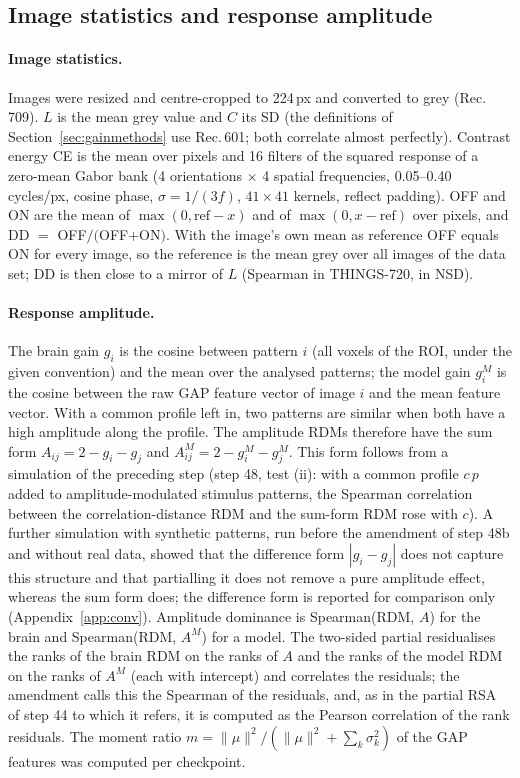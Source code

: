 \subsection{Image statistics and response amplitude}
\label{sec:ampmethods}

\paragraph{Image statistics.} Images were resized and centre-cropped to 224\,px and converted to grey
(Rec.\,709). $L$ is the mean grey value and $C$ its SD (the definitions of Section~\ref{sec:gainmethods}
use Rec.\,601; both correlate almost perfectly). Contrast energy CE is the mean over pixels and 16
filters of the squared response of a zero-mean Gabor bank (4 orientations $\times$ 4 spatial
frequencies, 0.05--0.40 cycles/px, cosine phase, $\sigma = 1/(3 f)$, $41 \times 41$ kernels, reflect
padding). OFF and ON are the mean of $\max(0, \mathrm{ref} - x)$ and of $\max(0, x - \mathrm{ref})$
over pixels, and DD $=$ OFF$/($OFF$+$ON$)$. With the image's own mean as reference OFF equals ON for
every image, so the reference is the mean grey over all images of the data set; DD is then close to a
mirror of $L$ (Spearman \ImgSpearLDD{} in THINGS-720, \ImgSpearLDDNsd{} in NSD).

\paragraph{Response amplitude.} The brain gain $g_i$ is the cosine between pattern $i$ (all voxels of
the ROI, under the given convention) and the mean over the analysed patterns; the model gain $g^M_i$
is the cosine between the raw GAP feature vector of image $i$ and the mean feature vector. With a
common profile left in, two patterns are similar when both have a high amplitude along the profile.
The amplitude RDMs therefore have the sum form $A_{ij} = 2 - g_i - g_j$ and
$A^M_{ij} = 2 - g^M_i - g^M_j$. This form follows from a simulation of the preceding step (step 48,
test (ii): with a common profile $c\,p$ added to amplitude-modulated stimulus patterns, the Spearman
correlation between the correlation-distance RDM and the sum-form RDM rose with $c$). A further
simulation with synthetic patterns, run before the amendment of step 48b and without real data,
showed that the difference form $|g_i - g_j|$ does not capture this structure and that partialling it
does not remove a pure amplitude effect, whereas the sum form does; the difference form is reported
for comparison only (Appendix~\ref{app:conv}). Amplitude dominance is Spearman(RDM, $A$) for the brain
and Spearman(RDM, $A^M$) for a model. The two-sided partial residualises the ranks of the brain RDM on
the ranks of $A$ and the ranks of the model RDM on the ranks of $A^M$ (each with intercept) and
correlates the residuals; the amendment calls this the Spearman of the residuals, and, as in the
partial RSA of step 44 to which it refers, it is computed as the Pearson correlation of the rank
residuals. The moment ratio $m = \lVert \mu \rVert^2 / (\lVert \mu \rVert^2 + \sum_k \sigma_k^2)$ of the
GAP features \citep{evalres} was computed per checkpoint.

